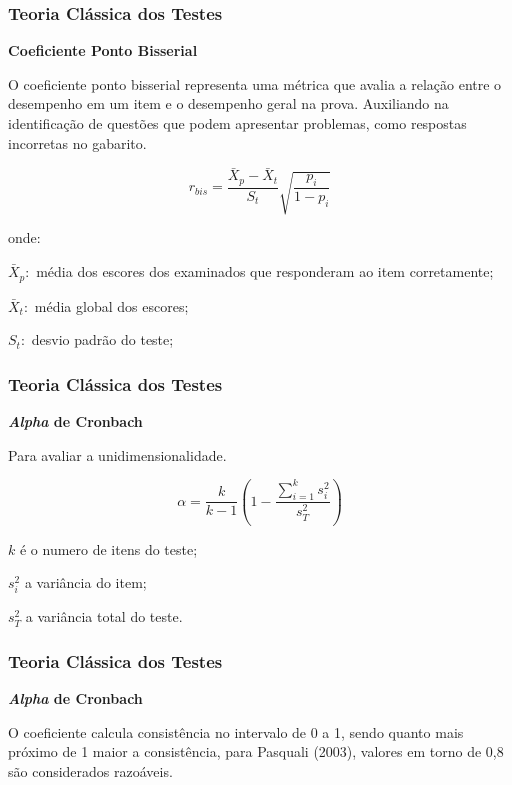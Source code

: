 \documentclass{beamer}
\begin{document}
	\begin{frame}
		
		\frametitle{Teoria Clássica dos Testes}
		\begin{center}
			\textbf{Coeficiente Ponto Bisserial}
		\end{center}
		O coeficiente ponto bisserial representa uma métrica que avalia a relação entre o desempenho em um item e o desempenho geral na prova.
		Auxiliando na identificação de questões que podem apresentar problemas, como respostas incorretas no gabarito.
		
		\[
			r_{bis} = \frac{\bar{X}_p - \bar{X}_t}{S_t}
			\sqrt{\frac{p_i}{1 - p_i}}
		\]
			
	
		onde:
		
		
		$ \bar{X}_p :$ média dos escores dos examinados que responderam ao item corretamente;
		
		$ \bar{X}_t :$  média global dos escores;
		
		$ S_t :$  desvio padrão do teste;
		\end{frame}
	
	
	\begin{frame}
	
	\frametitle{Teoria Clássica dos Testes}
	\begin{center}
		\textbf{\textit{Alpha} de Cronbach}
	\end{center}
		Para avaliar a unidimensionalidade.
	
	
	\[
		\alpha = \frac{k}{k-1}(1 - \frac{\sum_{i=1}^{k}{s^2_i}}{s_T^2})
	\]
	
	
	$k$ é o numero de itens do teste;
	
	${s_i^2}$ a variância do item;
	
	${s_T^2}$ a variância total do teste.
	

	\end{frame}

	
	
	
	\begin{frame}
	
	\frametitle{Teoria Clássica dos Testes}
	
		\begin{center}
		\textbf{\textit{Alpha} de Cronbach}
		\end{center}
	
		O coeficiente calcula consistência no intervalo de 0 a 1, sendo quanto mais próximo de 1 maior a consistência, para Pasquali (2003), valores em torno de 0,8 são considerados razoáveis.
		
	\end{frame}
		
\end{document}
